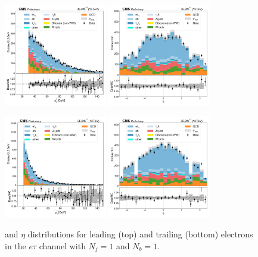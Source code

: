 \begin{figure}[htb!]
    \centering
    \includegraphics[width=0.4\textwidth]{chapters/Analysis/sectionPlots/figures/data_mc_overlays/etau_2016_cat_eq1_eq1_signal_linear_lepton_lepton1_pt}
    \includegraphics[width=0.4\textwidth]{chapters/Analysis/sectionPlots/figures/data_mc_overlays/etau_2016_cat_eq1_eq1_signal_linear_lepton_lepton1_eta}

    \includegraphics[width=0.4\textwidth]{chapters/Analysis/sectionPlots/figures/data_mc_overlays/etau_2016_cat_eq1_eq1_signal_linear_lepton_lepton2_pt}
    \includegraphics[width=0.4\textwidth]{chapters/Analysis/sectionPlots/figures/data_mc_overlays/etau_2016_cat_eq1_eq1_signal_linear_lepton_lepton2_eta}
    \caption{\pt and $\eta$ distributions for leading (top) and trailing
        (bottom) electrons in the $e\tau$ channel with $N_{j} = 1$ and
        $N_{b} = 1$.}
    \label{fig:analysis:plots:etau_3_kinematic}
\end{figure}

